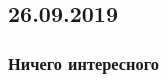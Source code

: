 \documentclass[main]{subfiles}
\begin{document}
  \subsection{26.09.2019}
  \subsubsection{Ничего интересного}
\end{document}
